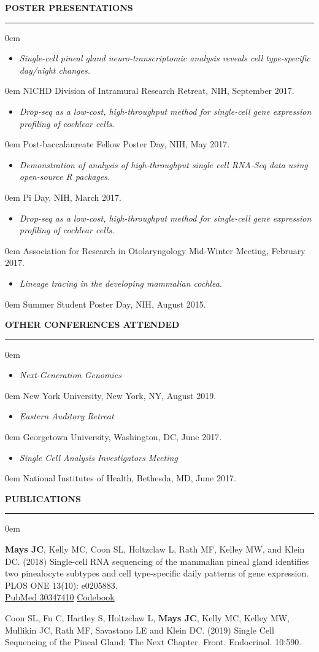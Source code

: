 \documentclass[11pt, letterpaper]{article}
\newenvironment{CVSection}{
\begin{addmargin}[2em]{0em}
\begin{samepage}}
{\end{samepage}
\end{addmargin}\bigskip}
\newcommand{\CVList}[2]{
\begin{samepage}
\begin{itemize}[leftmargin=*]
\item \textsl{#1}
\end{itemize}
\begin{addmargin}[2.5em]{0em}
#2
\end{addmargin}
\end{samepage}
}
\newcommand{\CVHeading}[1]{
\MakeUppercase{\bf #1}
\smallskip
\hrule
\medskip
}
\begin{document}
\CVHeading{Poster Presentations}
\begin{CVSection}
\CVList{Single-cell pineal gland neuro-transcriptomic analysis reveals cell type-specific day/night changes.}{NICHD Division of Intramural Research Retreat, NIH, September 2017.}
\CVList{Drop-seq as a low-cost, high-throughput method for single-cell gene expression profiling of cochlear cells.}{Post-baccalaureate Fellow Poster Day, NIH, May 2017.}
\CVList{Demonstration of analysis of high-throughput single cell RNA-Seq data using open-source R packages.}{Pi Day, NIH, March 2017.}
\CVList{Drop-seq as a low-cost, high-throughput method for single-cell gene expression profiling of cochlear cells.}{Association for Research in Otolaryngology Mid-Winter Meeting, February 2017.}
\CVList{Lineage tracing in the developing mammalian cochlea.}{Summer Student Poster Day, NIH, August 2015.}
\end{CVSection}

\CVHeading{Other Conferences Attended}
\begin{CVSection}
\CVList{Next-Generation Genomics}{New York University, New York, NY, August 2019.}
\CVList{Eastern Auditory Retreat}{Georgetown University, Washington, DC, June 2017.}
\CVList{Single Cell Analysis Investigators Meeting}{National Institutes of Health, Bethesda, MD, June 2017.}
\end{CVSection}



\CVHeading{Publications}
\begin{CVSection}


\textbf{Mays JC}, Kelly MC, Coon SL, Holtzclaw L, Rath MF, Kelley MW, and Klein DC. (2018) Single-cell RNA sequencing of the mammalian pineal gland identifies two pinealocyte subtypes and cell type-specific daily patterns of gene expression. PLOS ONE 13(10): e0205883.\\
\hspace{2 in}\href{https://www.ncbi.nlm.nih.gov/pubmed/30347410}{\faFileTextO\hspace{1mm}PubMed 30347410}
\hspace{2mm}\href{https://github.com/joeymays/PinealGland_SingleCell}{\faCode\hspace{1mm}Codebook}\medskip

Coon SL, Fu C, Hartley S, Holtzclaw L, \textbf{Mays JC}, Kelly MC, Kelley MW, Mullikin JC, Rath MF, Savastano LE and Klein DC. (2019) Single Cell Sequencing of the Pineal Gland: The Next Chapter. Front. Endocrinol. 10:590.

\end{CVSection}
\end{document}
